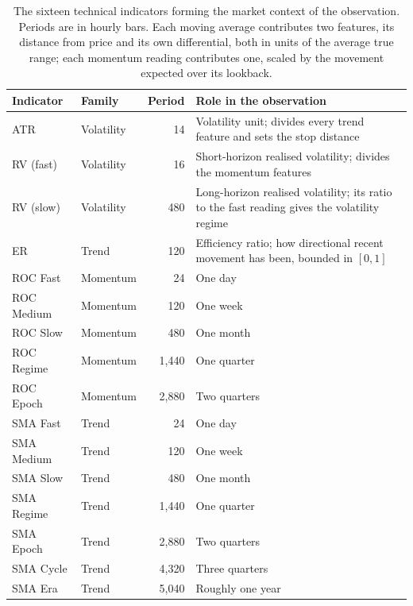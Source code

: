 \begin{table}[htb!]
\centering
\footnotesize
\begin{tabularx}{\textwidth}{@{}llrX@{}}
\toprule
\textbf{Indicator} & \textbf{Family} & \textbf{Period} & \textbf{Role in the observation} \\
\midrule
ATR & Volatility & 14 & Volatility unit; divides every trend feature and sets the stop distance \\
\addlinespace
RV (fast) & Volatility & 16 & Short-horizon realised volatility; divides the momentum features \\
RV (slow) & Volatility & 480 & Long-horizon realised volatility; its ratio to the fast reading gives the volatility regime \\
\addlinespace
ER & Trend & 120 & Efficiency ratio; how directional recent movement has been, bounded in $[0, 1]$ \\
\addlinespace
ROC Fast & Momentum & 24 & One day \\
ROC Medium & Momentum & 120 & One week \\
ROC Slow & Momentum & 480 & One month \\
ROC Regime & Momentum & 1{,}440 & One quarter \\
ROC Epoch & Momentum & 2{,}880 & Two quarters \\
\addlinespace
SMA Fast & Trend & 24 & One day \\
SMA Medium & Trend & 120 & One week \\
SMA Slow & Trend & 480 & One month \\
SMA Regime & Trend & 1{,}440 & One quarter \\
SMA Epoch & Trend & 2{,}880 & Two quarters \\
SMA Cycle & Trend & 4{,}320 & Three quarters \\
SMA Era & Trend & 5{,}040 & Roughly one year \\
\bottomrule
\end{tabularx}
\caption{The sixteen technical indicators forming the market context of the observation. Periods are in hourly bars. Each moving average contributes two features, its distance from price and its own differential, both in units of the average true range; each momentum reading contributes one, scaled by the movement expected over its lookback.}
\label{Tables:Observation}
\end{table}